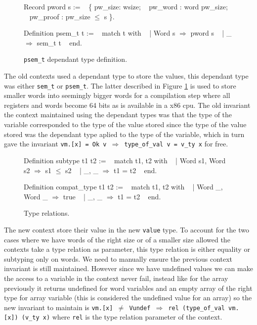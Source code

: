 \documentclass{article}
\begin{document}
\medskip

\begin{figure}
\obeylines\obeyspaces\ttfamily%
Record pword s :=
~ \{ pw\_size: wsize;
~   pw\_word : word pw\_size;
~   pw\_proof : pw\_size \(\leq\) s \}.

Definition psem\_t t :=
~ match t with
~ | Word s \(\Rightarrow\) pword s
~ | \_      \(\Rightarrow\) sem\_t t
~ end.
\normalfont%
\caption{\texttt{psem\_t} dependant type definition.}\label{fig:psemt}
\end{figure}

The old contexts used a dependant type to store the values, this dependant type
was either \texttt{sem\_t} or \texttt{psem\_t}. The latter described in Figure
\ref{fig:psemt} is used to store smaller words into seemingly bigger words for
a compilation step where all registers and words become 64 bits as is available
in a x86 cpu. The old invariant the context maintained using the dependant types
was that the type of the variable corresponded to the type of the value stored
since the type of the value stored was the dependant type aplied to the type of
the variable, which in turn gave the invariant
\texttt{vm.[x] = Ok v \(\Longrightarrow\) type\_of\_val v = v\_ty x} for free.

\begin{figure}[t]
\obeylines\obeyspaces\ttfamily%
Definition subtype t1 t2 :=
~ match t1, t2 with
~ | Word s1, Word s2 \(\Rightarrow\) s1 \(\leq\) s2
~ | \_,       \_       \(\Rightarrow\) t1 = t2
~ end.

Definition compat\_type t1 t2 :=
~ match t1, t2 with
~ | Word \_, Word \_ \(\Rightarrow\) true
~ | \_,      \_      \(\Rightarrow\) t1 = t2
~ end.
\normalfont%
\caption{Type relations.}
\end{figure}

The new context store their value in the new \texttt{value} type. To account for
the two cases where we have words of the right size or of a smaller size allowed
the contexts take a type relation as parameter, this type relation is either
equality or subtyping only on words. We need to manually ensure the previous
context invariant is still maintained. However since we have undefined values we
can make the access to a variable in the context never fail, instead like for
the array previously it returns undefined for word variables and an empty array
of the right type for array variable (this is considered the undefined value for
an array) so the new invariant to maintain is
\texttt{vm.[x] \(\neq\) Vundef \(\Longrightarrow\) rel (type\_of\_val vm.[x]) (v\_ty x)}
where \texttt{rel} is the type relation parameter of the context.
\end{document}

